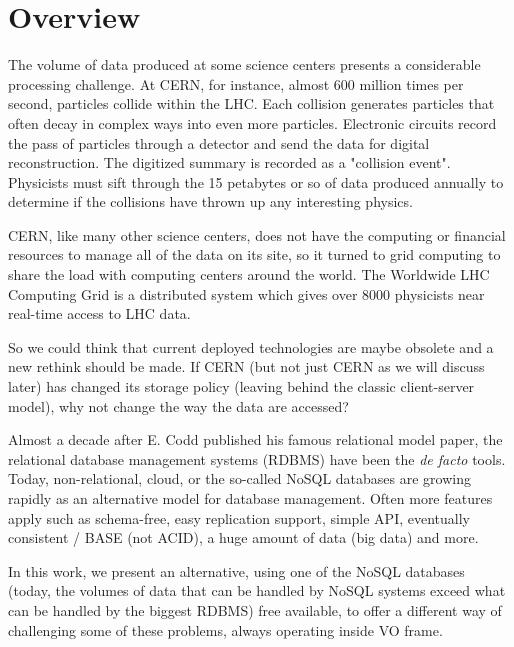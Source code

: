 \chapter{Overview}


The volume of data produced at some science centers presents a considerable processing challenge. At CERN, for instance, almost 600 million times per second, particles collide within the LHC. Each collision generates particles that often decay in complex ways into even more particles. Electronic circuits record the pass of particles through a detector and send the data for digital reconstruction. The digitized summary is recorded as a "collision event". Physicists must sift through the 15 petabytes or so of data produced annually to determine if the collisions have thrown up any interesting physics. \newline

CERN, like many other science centers, does not have the computing or financial resources to manage all of the data on its site, so it turned to grid computing to share the load with computing centers around the world. The Worldwide LHC Computing Grid is a distributed system which gives over 8000 physicists near real-time access to LHC data.  \newline

So we could think that current deployed technologies are maybe obsolete and a new rethink should be made. If CERN (but not just CERN as we will discuss later) has changed its storage policy (leaving behind the classic client-server model), why not change the way the data are accessed?  \newline

Almost a decade after E. Codd published his famous relational model paper, the relational database management systems (RDBMS) have been the \textit{de facto} tools. Today, non-relational, cloud, or the so-called NoSQL databases are growing rapidly as an alternative model for database management. Often more features apply such as schema-free, easy replication support, simple API, eventually consistent / BASE (not ACID), a huge amount of data (big data) and more. \newline

In this work, we present an alternative, using one of the NoSQL databases (today, the volumes of data that can be handled by NoSQL systems exceed what can be handled by the biggest RDBMS) free available, to offer a different way of challenging some of these problems, always operating inside VO frame.
